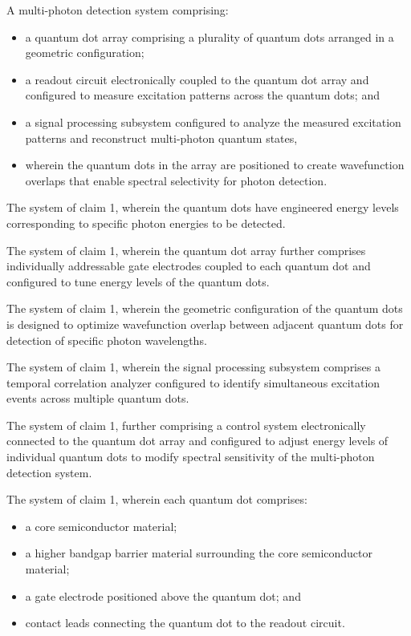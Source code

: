 \documentclass[12pt,letterpaper]{article}
\begin{document}
\begin{patentclaims}
    \item A multi-photon detection system comprising:
    \begin{itemize}[leftmargin=2em]
        \item a quantum dot array comprising a plurality of quantum dots arranged in a geometric configuration;
        \item a readout circuit electronically coupled to the quantum dot array and configured to measure excitation patterns across the quantum dots; and
        \item a signal processing subsystem configured to analyze the measured excitation patterns and reconstruct multi-photon quantum states,
        \item wherein the quantum dots in the array are positioned to create wavefunction overlaps that enable spectral selectivity for photon detection.
    \end{itemize}
    
    \item The system of claim 1, wherein the quantum dots have engineered energy levels corresponding to specific photon energies to be detected.
    
    \item The system of claim 1, wherein the quantum dot array further comprises individually addressable gate electrodes coupled to each quantum dot and configured to tune energy levels of the quantum dots.
    
    \item The system of claim 1, wherein the geometric configuration of the quantum dots is designed to optimize wavefunction overlap between adjacent quantum dots for detection of specific photon wavelengths.
    
    \item The system of claim 1, wherein the signal processing subsystem comprises a temporal correlation analyzer configured to identify simultaneous excitation events across multiple quantum dots.
    
    \item The system of claim 1, further comprising a control system electronically connected to the quantum dot array and configured to adjust energy levels of individual quantum dots to modify spectral sensitivity of the multi-photon detection system.
    
    \item The system of claim 1, wherein each quantum dot comprises:
    \begin{itemize}[leftmargin=2em]
        \item a core semiconductor material;
        \item a higher bandgap barrier material surrounding the core semiconductor material;
        \item a gate electrode positioned above the quantum dot; and
        \item contact leads connecting the quantum dot to the readout circuit.
    \end{itemize}
    

\end{patentclaims}
\end{document}
